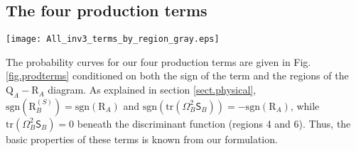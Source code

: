 \documentclass[preprint,amssymb,amsmath,aip,cha]{revtex4-1}
\begin{document}
\subsection{The four production terms}
\begin{figure*}
  \texttt{[image: All\_inv3\_terms\_by\_region\_gray.eps]}
\caption{Probability curves (on $\mbox{log}_{10}$ axes) for all the production terms conditioned on the region of the $Q_{A}-R_{A}$ diagram and the signs of the terms. Results are non-dimensionalized by the Kolmogorov time cubed and for each pair of panels, the left-hand panels are the distribution functions for the negative values (results multiplied by -1 before taking the logarithm) and the right-hand panels are the positive values.}
\label{fig.prodterms}       %
\end{figure*}

The probability curves for our four production terms are given in Fig. \ref{fig.prodterms} conditioned on both the sign of the term and the regions of the $\mbox{Q}_{A}-\mbox{R}_{A}$ diagram. As explained in section \ref{sect.physical}, $\mbox{sgn}(\mbox{R}_{B}^{(S)}) =  \mbox{sgn}(\mbox{R}_{A})$ and $\mbox{sgn}(\mbox{tr}(\mathsf{\Omega}^{2}_{B}\mathsf{S}_{B})) =  -\mbox{sgn}(\mbox{R}_{A})$, while $\mbox{tr}(\mathsf{\Omega}^{2}_{B}\mathsf{S}_{B}) = 0$ beneath the discriminant function (regions 4 and 6). Thus, the basic properties of these terms is known from our formulation.
\end{document}
